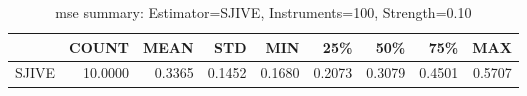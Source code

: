\begin{table}[ht]
\centering
\caption{mse summary: Estimator=SJIVE, Instruments=100, Strength=0.10}
\begin{tabular}{lrrrrrrrr}
\toprule
 & COUNT & MEAN & STD & MIN & 25\% & 50\% & 75\% & MAX \\
\midrule
SJIVE & 10.0000 & 0.3365 & 0.1452 & 0.1680 & 0.2073 & 0.3079 & 0.4501 & 0.5707 \\
\bottomrule
\end{tabular}
\end{table}
